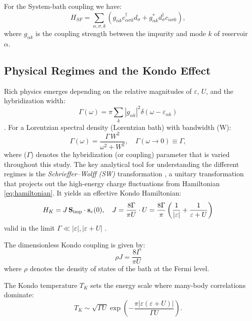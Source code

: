 \documentclass[preprint,1p]{elsarticle}
\begin{document}
For the System-bath coupling we have:
\begin{equation}
H_{SF} = \sum_{\alpha, \sigma, k} \left( g_{\alpha k} c_{\alpha \sigma k}^\dagger d_{\sigma} + g_{\alpha k}^* d_{\sigma}^\dagger c_{\alpha \sigma k} \right),
\label{eq:hamiltonian_coupling}
\end{equation}
where $g_{\alpha k}$ is the coupling strength between the impurity and mode $k$ of reservoir $\alpha$.

\subsection{Physical Regimes and the Kondo Effect}

Rich physics emerges depending on the relative magnitudes of $\varepsilon$, $U$, and the hybridization width: 
$$\Gamma (\omega) = \pi \sum_k |g_{\alpha k}|^2 \delta(\omega - \varepsilon_{\alpha k})$$.
For a Lorentzian spectral density (Lorentzian bath) with bandwidth (W):
\begin{equation}
	\Gamma(\omega) = \frac{\Gamma\, W^2}{\omega^2 + W^2},
	\quad \Gamma(\omega \to 0) \equiv \Gamma,
\end{equation}
where ($\Gamma$) denotes the hybridization (or coupling) parameter that is varied throughout this study.
The key analytical tool for understanding the different regimes is the \emph{Schrieffer–Wolff (SW)} transformation \cite{schrieffer1966relation}, a unitary transformation that projects out the high-energy charge fluctuations from Hamiltonian \eqref{eq:hamiltonian}. It yields an effective Kondo Hamiltonian:
\begin{equation}
	H_K = J\, \mathbf{S}_{\rm imp} \cdot \mathbf{s}_e(0),
	\quad
	J = \frac{8\Gamma}{\pi U}\cdot U
	= \frac{8\Gamma}{\pi}\left(\frac{1}{|\varepsilon|} +
	\frac{1}{\varepsilon+U}\right)
\end{equation}
valid in the limit $\Gamma \ll |\varepsilon|, |\varepsilon+U|$
\cite{pavarini_dynamical_2022,SchriefferWolff1966}.

The dimensionless Kondo coupling is given by:
\begin{equation}
	\rho J = \frac{8\Gamma}{\pi U}
	\label{eq:rhoJ}
\end{equation}
where $\rho$  denotes the density of states of the bath at the Fermi level.


The Kondo temperature $T_K$ sets the energy scale where many-body correlations dominate:
\begin{equation}
T_K \sim \sqrt{\Gamma U} \exp\left( -\frac{\pi |\varepsilon(\varepsilon + U)|}{\Gamma U} \right).
\label{eq:kondo_temperature}
\end{equation}
\end{document}
